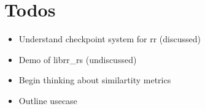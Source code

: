 \maketitle

\section{Todos}
\begin{itemize}
    \item Understand checkpoint system for rr (discussed)
    \item Demo of librr\_rs (undiscussed)
    \item Begin thinking about similartity metrics
    \item Outline usecase
\end{itemize}



